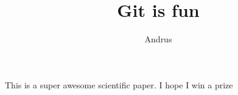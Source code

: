 \documentclass[10pt]{article}
\author{Andrus}
\title{Git is fun}
\begin{document}
    \maketitle

    This is a super awesome scientific paper.
    I hope I win a prize
\end{document}

